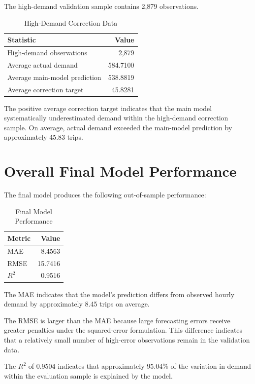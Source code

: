 \documentclass[11pt]{article}
\begin{document}
The high-demand validation sample contains 2,879 observations.

\begin{table}[H]
\centering
\caption{High-Demand Correction Data}
\begin{tabular}{lr}
\toprule
Statistic & Value \\
\midrule
High-demand observations & 2,879 \\
Average actual demand & 584.7100 \\
Average main-model prediction & 538.8819 \\
Average correction target & 45.8281 \\
\bottomrule
\end{tabular}
\end{table}

The positive average correction target indicates that the main model
systematically underestimated demand within the high-demand correction
sample. On average, actual demand exceeded the main-model prediction
by approximately 45.83 trips.


\section{Overall Final Model Performance}

The final model produces the following out-of-sample performance:

\begin{table}[H]
\centering
\caption{Final Model Performance}
\begin{tabular}{lr}
\toprule
Metric & Value \\
\midrule
MAE & 8.4563 \\
RMSE & 15.7416 \\
$R^2$ & 0.9516 \\
\bottomrule
\end{tabular}
\end{table}

The MAE indicates that the model's prediction differs from observed
hourly demand by approximately 8.45 trips on average.

The RMSE is larger than the MAE because large forecasting errors
receive greater penalties under the squared-error formulation.
This difference indicates that a relatively small number of
high-error observations remain in the validation data.

The $R^2$ of 0.9504 indicates that approximately 95.04\% of the
variation in demand within the evaluation sample is explained by
the model.
\end{document}
